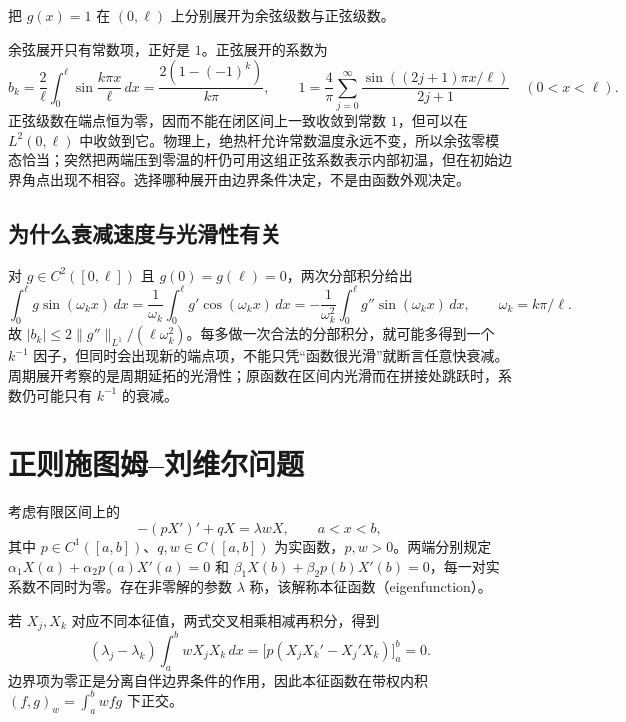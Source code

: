 \documentclass[UTF8,12pt,a4paper,fontset=fandol]{ctexbook}
\begin{document}
\begin{example}[同一函数的两种展开]
把 $g(x)=1$ 在 $(0,\ell)$ 上分别展开为余弦级数与正弦级数。
\end{example}
\begin{solve}
余弦展开只有常数项，正好是 $1$。正弦展开的系数为
\[
 b_k=\frac2\ell\int_0^\ell\sin\frac{k\pi x}{\ell}\,dx
 =\frac{2(1-(-1)^k)}{k\pi},\qquad
 1=\frac4\pi\sum_{j=0}^\infty\frac{\sin((2j+1)\pi x/\ell)}{2j+1}
 \quad(0<x<\ell).
\]
正弦级数在端点恒为零，因而不能在闭区间上一致收敛到常数 $1$，但可以在 $L^2(0,\ell)$ 中收敛到它。物理上，绝热杆允许常数温度永远不变，所以余弦零模态恰当；突然把两端压到零温的杆仍可用这组正弦系数表示内部初温，但在初始边界角点出现不相容。选择哪种展开由边界条件决定，不是由函数外观决定。
\end{solve}

\subsection{为什么衰减速度与光滑性有关}
对 $g\in C^2([0,\ell])$ 且 $g(0)=g(\ell)=0$，两次分部积分给出
\[
 \int_0^\ell g\sin(\omega_kx)\,dx
 =\frac1{\omega_k}\int_0^\ell g'\cos(\omega_kx)\,dx
 =-\frac1{\omega_k^2}\int_0^\ell g''\sin(\omega_kx)\,dx,
 \qquad \omega_k=k\pi/\ell.
\]
故 $|b_k|\le 2\|g''\|_{L^1}/(\ell\omega_k^2)$。每多做一次合法的分部积分，就可能多得到一个 $k^{-1}$ 因子，但同时会出现新的端点项，不能只凭“函数很光滑”就断言任意快衰减。周期展开考察的是周期延拓的光滑性；原函数在区间内光滑而在拼接处跳跃时，系数仍可能只有 $k^{-1}$ 的衰减。

\section{正则施图姆--刘维尔问题}
考虑有限区间上的
\begin{equation}
 -(pX')'+qX=\lambda wX,\qquad a<x<b,
 \label{eq:sturm-liouville}
\end{equation}
其中 $p\in C^1([a,b])$、$q,w\in C([a,b])$ 为实函数，$p,w>0$。两端分别规定 $\alpha_1X(a)+\alpha_2p(a)X'(a)=0$ 和 $\beta_1X(b)+\beta_2p(b)X'(b)=0$，每一对实系数不同时为零。存在非零解的参数 $\lambda$ 称，该解称本征函数（eigenfunction）。

若 $X_j,X_k$ 对应不同本征值，两式交叉相乘相减再积分，得到
\[
 (\lambda_j-\lambda_k)\int_a^b wX_jX_k\,dx
 =\bigl[p(X_jX_k'-X_j'X_k)\bigr]_a^b=0.
\]
边界项为零正是分离自伴边界条件的作用，因此本征函数在带权内积 $(f,g)_w=\int_a^b wfg$ 下正交。
\end{document}
